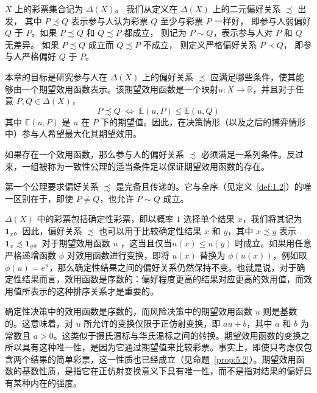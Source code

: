 \(X\) 上的彩票集合记为 \(\Delta(X)\)。
我们从定义在 \(\Delta(X)\) 上的二元偏好关系 \(\precsim\) 出发，
其中 \(P \precsim Q\) 表示参与人认为彩票 \(Q\) 至少与彩票 \(P\) 一样好，
即参与人弱偏好 \(Q\) 于 \(P\)。如果 \(P \precsim Q\) 和 \(Q \precsim P\) 都成立，
则记为 \(P \sim Q\)，表示参与人对 \(P\) 和 \(Q\) 无差异。
如果 \(P \precsim Q\) 成立而 \(Q \precsim P\) 不成立，
则定义严格偏好关系 \(P \prec Q\)，
即参与人严格偏好 \(Q\) 于 \(P\)。

本章的目标是研究参与人在 \(\Delta(X)\) 上的偏好关系 \(\precsim\) 应满足哪些条件，使其能够由一个期望效用函数表示。该期望效用函数是一个映射$u:X\to\mathbb{R}$，并且对于任意 \(P,Q\in\Delta(X)\)，
\begin{equation}
\label{eq:5.1}
P \precsim  Q\; \Leftrightarrow  \;\mathbb{E}\left( {u,P}\right)  \leq  \mathbb{E}\left( {u,Q}\right)
\end{equation}
其中 \(\mathbb{E}\left( {u,P}\right)\) 是 \(u\) 在 \(P\) 下的期望值。因此，在决策情形（以及之后的博弈情形中）参与人希望最大化其期望效用。

如果存在一个效用函数，那么参与人的偏好关系 \(\precsim\) 必须满足一系列条件。反过来，一组被称为一致性公理的适当条件足以保证期望效用函数的存在。

第一个公理要求偏好关系 \(\precsim\) 是完备且传递的。它与全序（见定义~\ref{def:1.2}）的唯一区别在于，即使 \(P\neq Q\)，也允许 \(P\sim Q\) 成立。

\(\Delta \left( X\right)\) 中的彩票包括确定性彩票，即以概率 $1$ 选择单个结果 \(x\)，我们将其记为 \({\mathbf{1}}_{x}\)。因此，偏好关系 \(\precsim\) 也可以用于比较确定性结果 \(x\) 和 \(y\)，其中 \(x \precsim  y\) 表示 \({\mathbf{1}}_{x} \precsim  {\mathbf{1}}_{y}\)。对于期望效用函数 \(u\) ，这当且仅当\(u\left( x\right)  \leq  u\left( y\right)\) 时成立。如果用任意严格递增函数 \(\phi\) 对效用函数进行变换，即将 \(u(x)\) 替换为 \(\phi(u(x))\)，例如取 \(\phi \left( u\right)  = {e}^{u}\)，那么确定性结果之间的偏好关系仍然保持不变。也就是说，对于确定性结果而言，效用函数是序数的：偏好程度更高的结果对应更高的效用值，而效用值所表示的这种排序关系才是重要的。

确定性决策中的效用函数是序数的，而风险决策中的期望效用函数 \(u\) 则是基数的。这意味着，对 \(u\) 所允许的变换仅限于正仿射变换，即 \(au+b\)，其中 \(a\) 和 \(b\) 为常数且 \(a>0\)。这类似于摄氏温标与华氏温标之间的转换。期望效用函数的变换之所以具有这种唯一性，是因为它通过期望值来比较彩票。事实上，即使只考虑仅包含两个结果的简单彩票，这一性质也已经成立（见命题~\ref{prop:5.2}）。期望效用函数的基数性质，是指它在正仿射变换意义下具有唯一性，而不是指对结果的偏好具有某种内在的强度。

